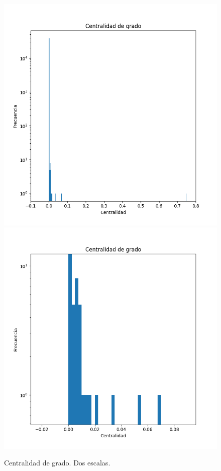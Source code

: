\documentclass[12pt]{extreport}
\begin{document}
    \begin{figure}
        \centering
        \includegraphics[scale=0.6]{degree_centrality.png}
        \includegraphics[scale=0.6]{degree_centrality_detail.png}
        \caption{Centralidad de grado. Dos escalas.}
        \label{fig:degcentr}
    \end{figure}
\end{document}
